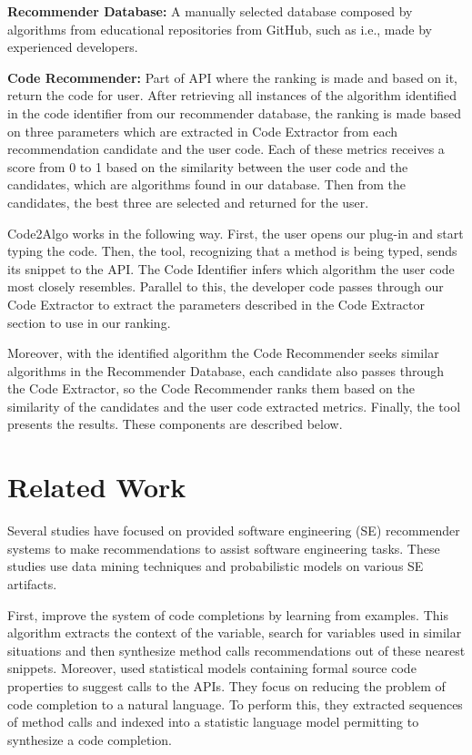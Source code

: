 \documentclass[12pt]{article}
\begin{document}
     \textbf{Recommender Database:} A manually selected database composed by algorithms from educational repositories from GitHub, such as \cite{TheAlgotithms} i.e., made by experienced developers.
        
    \textbf{Code Recommender:} Part of API where the ranking is made and based on it, return the code for user. After retrieving all instances of the algorithm identified in the code identifier from our recommender database, the ranking is made based on three parameters which are extracted in Code Extractor from each recommendation candidate and the user code. Each of these metrics receives a score from 0 to 1 based on the similarity between the user code and the candidates, which are algorithms found in our database. Then from the candidates, the best three are selected and returned for the user.
    
    Code2Algo works in the following way. First, the user opens our plug-in and start typing the code. Then, the tool, recognizing that a method is being typed, sends its snippet to the API. The Code Identifier infers which algorithm the user code most closely resembles. Parallel to this, the developer code passes through our Code Extractor to extract the parameters described in the Code Extractor section to use in our ranking.
    
    Moreover, with the identified algorithm the Code Recommender seeks similar algorithms in the Recommender Database, each candidate also passes through the Code Extractor, so the Code Recommender ranks them based on the similarity of the candidates and the user code extracted metrics. Finally, the tool presents the results. These components are described below.
    
   
\section{Related Work}
\label{sec:related_work}

Several studies have focused on provided software engineering (SE) recommender systems to make recommendations to assist software engineering tasks. These studies use data mining techniques and probabilistic models on various SE artifacts. 

First, \cite{Bruch2009} improve the system of code completions by learning from examples. This algorithm extracts the context of the variable, search for variables used in similar situations and then synthesize method calls recommendations out of these nearest snippets. Moreover, \cite{Raychev2014} used statistical models containing formal source code properties to suggest calls to the APIs. They focus on reducing the problem of code completion to a natural language. To perform this, they extracted sequences of method calls and indexed into a statistic language model permitting to synthesize a code completion.
\end{document}
